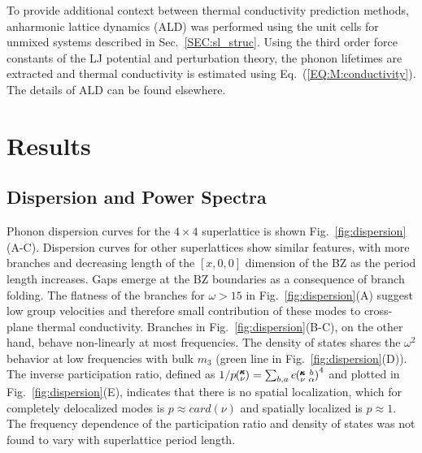 To provide additional context between thermal conductivity prediction methods, anharmonic lattice dynamics (ALD) was performed using the unit cells for unmixed systems described in Sec.~\ref{SEC:sl_struc}. Using the third order force constants of the LJ potential and perturbation theory, the phonon lifetimes are extracted and thermal conductivity is estimated using Eq.~(\ref{EQ:M:conductivity}). The details of ALD can be found elsewhere.\cite{PhysRevB.79.064301}

\section{Results}
\subsection{Dispersion and Power Spectra}

Phonon dispersion curves for the $4\times4$ superlattice is shown Fig.~\ref{fig:dispersion}(A-C). Dispersion curves for other superlattices show similar features, with more branches and decreasing length of the $[x,0,0]$ dimension of the BZ as the period length increases. Gaps emerge at the BZ boundaries as a consequence of branch folding.\cite{PhysRevB.38.1427,PhysRevB.60.2627} The flatness of the branches for $\omega > 15$ in Fig.~\ref{fig:dispersion}(A) suggest low group velocities and therefore small contribution of these modes to cross-plane thermal conductivity. Branches in Fig.~\ref{fig:dispersion}(B-C), on the other hand, behave non-linearly at most frequencies. The density of states shares the $\omega^2$ behavior at low frequencies with bulk $m_3$ (green line in Fig.~\ref{fig:dispersion}(D)). The inverse participation ratio, defined as $1/p\mspace{-4.0mu}\left(\mspace{-8.0mu} \begin{smallmatrix}&\pmb{\kappa} \\&\nu\end{smallmatrix} \mspace{-3.0mu}\right)=\sum_{b,a}e\mspace{-4.0mu}\left(\mspace{-8.0mu} \begin{smallmatrix} &\pmb{\kappa} &b \\ &\nu &\alpha\end{smallmatrix} \mspace{-3.0mu}\right)^4$ and plotted in Fig.~\ref{fig:dispersion}(E), indicates that there is no spatial localization, which for completely delocalized modes is $p\approx card(\nu)$ and spatially localized is $p\approx 1$. \cite{PhysRevB.70.235214} The frequency dependence of the participation ratio and density of states was not found to vary with superlattice period length.
\renewcommand{\topfraction}{0.7}
\begin{figure*}%
\begin{center}
\renewcommand{\figure}{Fig.}
\caption{Dispersion (A,B,C), density of states (D) and inverse participation ratio (E) of a $4\times4$ superlattice. Red squares represent select modes for Fig.~\ref{fig:sed}.}
\label{fig:dispersion}
\end{center}
\end{figure*}

